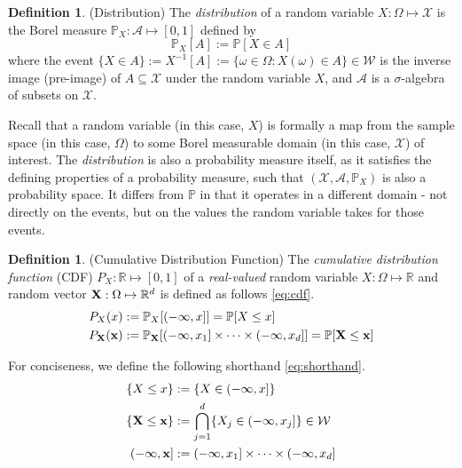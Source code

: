 \documentclass[twoside]{article} \usepackage{aistats2017}
\theoremstyle{definition}
\newtheorem{definition}[theorem]{Definition}
\newcommand{\rv}[1]{{#1}}
\begin{document}
	\begin{definition} \label{def:distribution}
		(Distribution)
		The \textit{distribution} of a random variable $\rv{X} : \Omega \mapsto \mathcal{X}$ is the Borel measure $\mathbb{P}_{\rv{X}} : \mathcal{A} \mapsto [0, 1]$ defined by
		\begin{equation}
		\mathbb{P}_{\rv{X}}[A] := \mathbb{P}[\rv{X} \in A]
		\label{eq:distribution}
		\end{equation}
		where the event $\{\rv{X} \in A\} := \rv{X}^{-1}[A] := \{\omega \in \Omega : \rv{X}(\omega) \in A\} \in \mathcal{W}$ is the inverse image (pre-image) of $A \subseteq \mathcal{X}$ under the random variable $\rv{X}$, and $\mathcal{A}$ is a $\sigma$-algebra of subsets on $\mathcal{X}$.
		
		Recall that a random variable (in this case, $\rv{X}$) is formally a map from the sample space (in this case, $\Omega$) to some Borel measurable domain (in this case, $\mathcal{X}$) of interest. The \textit{distribution} is also a probability measure itself, as it satisfies the defining properties of a probability measure, such that $(\mathcal{X}, \mathcal{A}, \mathbb{P}_{\rv{X}})$ is also a probability space. It differs from $\mathbb{P}$ in that it operates in a different domain - not directly on the events, but on the values the random variable takes for those events.
	\end{definition}
	
	\begin{definition} \label{def:cdf}
		(Cumulative Distribution Function)
		The \textit{cumulative distribution function} (CDF) $P_{\rv{X}} : \mathbb{R} \mapsto [0, 1]$ of a \textit{real-valued} random variable $\rv{X} : \Omega \mapsto \mathbb{R}$ and random vector $\bvec{\rv{X}} : \Omega \mapsto \mathbb{R}^{d}$ is defined as follows \eqref{eq:cdf}.
		\begin{equation}
		\begin{aligned}
		P_{\rv{X}}(x) &:= \mathbb{P}_{\rv{X}}[(-\infty, x]] = \mathbb{P}[\rv{X} \leq x] \\
		P_{\bvec{\rv{X}}}(\bvec{x}) &:= \mathbb{P}_{\bvec{\rv{X}}}[(-\infty, x_{1}] \times \dots \times (-\infty, x_{d}]] = \mathbb{P}[\bvec{\rv{X}} \leq \bvec{x}] \\
		\end{aligned}
		\label{eq:cdf}
		\end{equation}
		
		For conciseness, we define the following shorthand \eqref{eq:shorthand}. 
		\begin{equation}
		\begin{aligned}
		\{\rv{X} \leq x\} &:= \{\rv{X} \in (-\infty, x]\} \\
		\{\bvec{\rv{X}} \leq \bvec{x}\} &:= \bigcap\limits_{j = 1}^{d} \{\rv{X}_{j} \in (-\infty, x_{j}]\} \in \mathcal{W} \\
		(-\bvec{\infty}, \bvec{x}] &:= (-\infty, x_{1}] \times \dots \times (-\infty, x_{d}] \\
		\end{aligned}
		\label{eq:shorthand}
		\end{equation}
	\end{definition}
	
\end{document}
